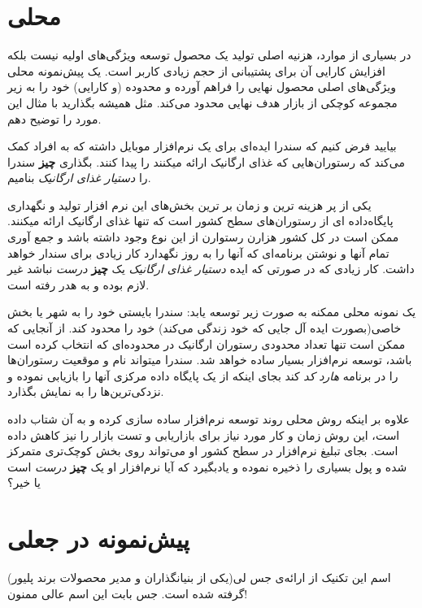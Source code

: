 \section{محلی}\label{ux645ux62dux644ux6cc}

در بسیاری از موارد، هزنیه اصلی تولید یک محصول توسعه ویژگی‌های اولیه نیست
بلکه افزایش کارایی آن برای پشتیبانی از حجم زیادی کاربر است. یک پیش‌نمونه
محلی ویژگی‌های اصلی محصول نهایی را فراهم آورده و محدوده (و کارایی) خود
را به زیر مجموعه کوچکی از بازار هدف نهایی محدود می‌کند. مثل همیشه
بگذارید با مثال این مورد را توضیح دهم.

بیایید فرض کنیم که سندرا ایده‌ای برای یک نرم‌افزار موبایل داشته که به
افراد کمک می‌کند که رستوران‌هایی که غذای ارگانیک ارائه میکنند را پیدا
کنند. بگذاری \textbf{چیز} سندرا را \emph{دستیار غذای ارگانیک} بنامیم.

یکی از پر هزینه ترین و زمان بر ترین بخش‌های این نرم افزار تولید و
نگهداری پایگاه‌داده ای از رستوران‌های سطح کشور است که تنها غذای ارگانیک
ارائه میکنند. ممکن است در کل کشور هزارن رستوارن از این نوع وجود داشته
باشد و جمع آوری تمام آنها و نوشتن برنامه‌ای که آنها را به روز نگهدارد
کار زیادی برای سندار خواهد داشت. کار زیادی که در صورتی که ایده
\emph{دستیار غذای ارگانیک} یک \textbf{چیز} \emph{درست} نباشد غیر لازم
بوده و به هدر رفته است.

یک نمونه محلی ممکنه به صورت زیر توسعه یابد: سندرا بایستی خود را به شهر
یا بخش خاصی(بصورت ایده آل جایی که خود زندگی می‌کند) خود را محدود کند. از
آنجایی که ممکن است تنها تعداد محدودی رستوران ارگانیک در محدوده‌ای که
انتخاب کرده است باشد، توسعه نرم‌افزار بسیار ساده خواهد شد. سندرا میتواند
نام و موقعیت رستوران‌ها را در برنامه \emph{هارد کد} کند بجای اینکه از یک
پایگاه داده مرکزی آنها را بازیابی نموده و نزدکی‌ترین‌ها را به نمایش
بگذارد.

علاوه بر اینکه روش محلی روند توسعه نرم‌افزار ساده سازی کرده و به آن شتاب
داده است، این روش زمان و کار مورد نیاز برای بازاریابی و تست بازار را نیز
کاهش داده است. بجای تبلیغ نرم‌افزار در سطح کشور او می‌تواند روی بخش
کوچک‌تری متمرکز شده و پول بسیاری را ذخیره نموده و یادبگیرد که آیا
نرم‌افزار او یک \textbf{چیز} \emph{درست} است یا خیر؟

\section{پیش‌نمونه در
جعلی}\label{ux67eux6ccux634ux646ux645ux648ux646ux647-ux62fux631-ux62cux639ux644ux6cc}

اسم این تکنیک از ارائه‌ی جس لی(یکی از بنیانگذاران و مدیر محصولات برند
پلیور) گرفته شده است. جس بابت این اسم عالی ممنون!

